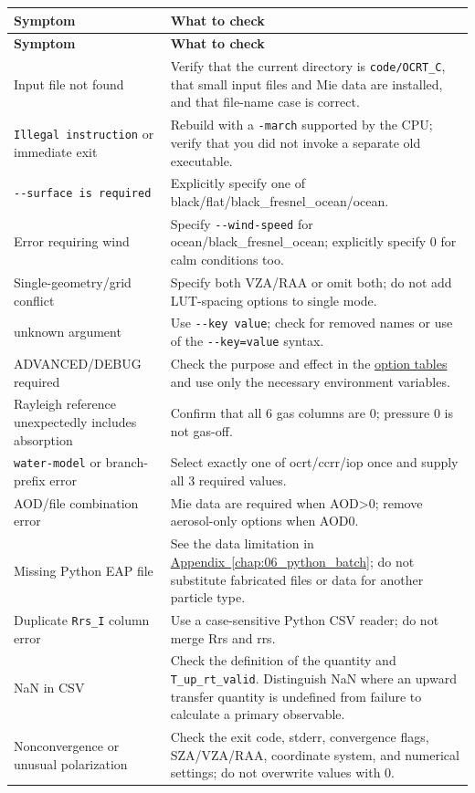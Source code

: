 {\TableFont
\begin{longtable}{@{}>{\raggedright\arraybackslash}p{}>{\raggedright\arraybackslash}p{}@{}}
\toprule
\textbf{Symptom} & \textbf{What to check} \\
\midrule
\endfirsthead
\toprule
\textbf{Symptom} & \textbf{What to check} \\
\midrule
\endhead
\bottomrule
\endfoot
Input file not found & Verify that the current directory is \texttt{code/\allowbreak{}OCRT\_\allowbreak{}C}, that small input files and Mie data are installed, and that file-name case is correct. \\
\texttt{Illegal instruct\allowbreak{}ion} or immediate exit & Rebuild with a \texttt{-\allowbreak{}march} supported by the CPU; verify that you did not invoke a separate old executable. \\
\texttt{-\allowbreak{}-\allowbreak{}surface is requi\allowbreak{}red} & Explicitly specify one of black/flat/black\_fresnel\_ocean/ocean. \\
Error requiring wind & Specify \texttt{-\allowbreak{}-\allowbreak{}wind-\allowbreak{}speed} for ocean/black\_fresnel\_ocean; explicitly specify 0 for calm conditions too. \\
Single-geometry/grid conflict & Specify both VZA/RAA or omit both; do not add LUT-spacing options to single mode. \\
unknown argument & Use \texttt{-\allowbreak{}-\allowbreak{}key value}; check for removed names or use of the \texttt{-\allowbreak{}-\allowbreak{}key=\allowbreak{}value} syntax. \\
ADVANCED/DEBUG required & Check the purpose and effect in the \hyperref[chap:03_options]{option tables} and use only the necessary environment variables. \\
Rayleigh reference unexpectedly includes absorption & Confirm that all 6 gas columns are 0; pressure 0 is not gas-off. \\
\texttt{water-\allowbreak{}model} or branch-prefix error & Select exactly one of ocrt/ccrr/iop once and supply all 3 required values. \\
AOD/file combination error & Mie data are required when AOD>0; remove aerosol-only options when AOD0. \\
Missing Python EAP file & See the data limitation in \hyperref[chap:06_python_batch]{Appendix~\ref*{chap:06_python_batch}}; do not substitute fabricated files or data for another particle type. \\
Duplicate \texttt{Rrs\_\allowbreak{}I} column error & Use a case-sensitive Python CSV reader; do not merge Rrs and rrs. \\
NaN in CSV & Check the definition of the quantity and \texttt{T\_\allowbreak{}up\_\allowbreak{}rt\_\allowbreak{}valid}. Distinguish NaN where an upward transfer quantity is undefined from failure to calculate a primary observable. \\
Nonconvergence or unusual polarization & Check the exit code, stderr, convergence flags, SZA/VZA/RAA, coordinate system, and numerical settings; do not overwrite values with 0. \\
\end{longtable}
}

